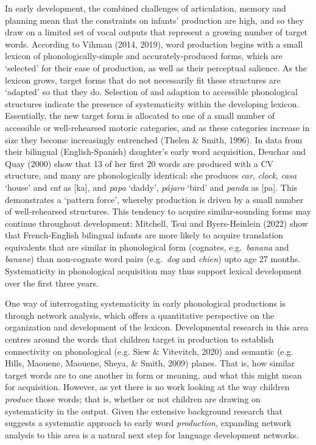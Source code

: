 \documentclass[
  man,mask,floatsintext]{apa6}
\begin{document}
In early development, the combined challenges of articulation, memory and planning mean that the constraints on infants' production are high, and so they draw on a limited set of vocal outputs that represent a growing number of target words. According to Vihman (2014, 2019), word production begins with a small lexicon of phonologically-simple and accurately-produced forms, which are `selected' for their ease of production, as well as their perceptual salience. As the lexicon grows, target forms that do not necessarily fit these structures are `adapted' so that they do. Selection of and adaption to accessible phonological structures indicate the presence of systematicity within the developing lexicon. Essentially, the new target form is allocated to one of a small number of accessible or well-rehearsed motoric categories, and as these categories increase in size they become increasingly entrenched (Thelen \& Smith, 1996). In data from their bilingual (English-Spanish) daughter's early word acquisition, Deuchar and Quay (2000) show that 13 of her first 20 words are produced with a CV structure, and many are phonologically identical: she produces \emph{car}, \emph{clock}, \emph{casa} `house' and \emph{cat} as {[}ka{]}, and \emph{papa} `daddy', \emph{pájaro} `bird' and \emph{panda} as {[}pa{]}. This demonstrates a `pattern force', whereby production is driven by a small number of well-rehearsed structures. This tendency to acquire similar-sounding forms may continue throughout development: Mitchell, Tsui and Byers-Heinlein (2022) show that French-English bilingual infants are more likely to acquire translation equivalents that are similar in phonological form (cognates, e.g.~\emph{banana} and \emph{banane}) than non-cognate word pairs (e.g.~\emph{dog} and \emph{chien}) upto age 27 months. Systematicity in phonological acquisition may thus support lexical development over the first three years.

One way of interrogating systematicity in early phonological productions is through network analysis, which offers a quantitative perspective on the organization and development of the lexicon. Developmental research in this area centres around the words that children target in production to establish connectivity on phonological (e.g. Siew \& Vitevitch, 2020) and semantic (e.g. Hills, Maouene, Maouene, Sheya, \& Smith, 2009) planes. That is, how similar target words are to one another in form or meaning, and what this might mean for acquisition. However, as yet there is no work looking at the way children \emph{produce} those words; that is, whether or not children are drawing on systematicity in the output. Given the extensive background research that suggests a systematic approach to early word \emph{production}, expanding network analysis to this area is a natural next step for language development networks.
\end{document}
